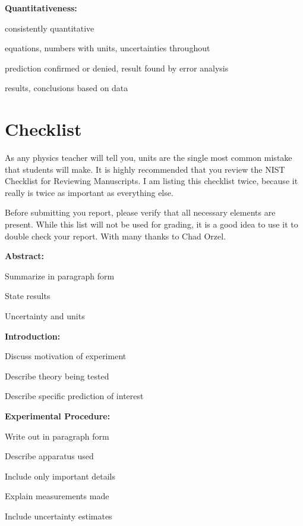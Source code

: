 \documentclass[
    10pt,aps,prl,
    amsfonts,
    amssymb,
    amsmath,
    runinaddress,
    secnum,
    showkeys,
    superscriptaddress,
    twocolumn,
]{revtex4}
\begin{document}
    \textbf{Quantitativeness:}
    \begin{itemize*}
        \item consistently quantitative
        \item equations, numbers with units, uncertainties throughout
        \item prediction confirmed or denied, result found by error analysis
        \item results, conclusions based on data
    \end{itemize*}

\section{Checklist}
    As any physics teacher will tell you, units are the single most common mistake that students will make.
    It is highly recommended that you review the NIST Checklist for Reviewing Manuscripts\cite{NISTsp811}.
    I am listing this checklist twice, because it really is twice as important as everything else.

    Before submitting you report, please verify that all necessary elements are present.
    While this list will not be used for grading,
        it is a good idea to use it to double check your report.
    With many thanks to Chad Orzel\cite{Orzel}.

    \textbf{Abstract:}
    \begin{itemize*}[label=\square]
        \item Summarize in paragraph form
        \item State results
        \item Uncertainty and units
    \end{itemize*}

    \textbf{Introduction:}
    \begin{itemize*}[label=\square]
        \item Discuss motivation of experiment
        \item Describe theory being tested
        \item Describe specific prediction of interest
    \end{itemize*}

    \textbf{Experimental Procedure:}
    \begin{itemize*}[label=\square]
        \item Write out in paragraph form
        \item Describe apparatus used
        \item Include only important details
        \item Explain measurements made
        \item Include uncertainty estimates
    \end{itemize*}
\end{document}
